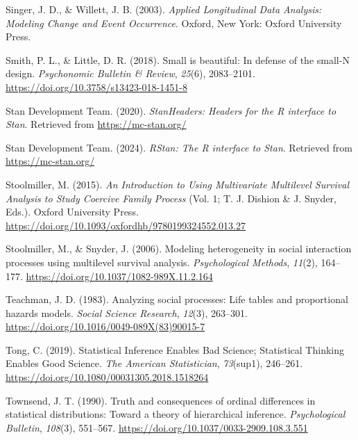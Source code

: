 \documentclass[
  man, donotrepeattitle,floatsintext]{apa6}
\newlength{\cslhangindent}
\newenvironment{CSLReferences}[2] %
 {\begin{list}{}{%
  \setlength{\itemindent}{0pt}
  \setlength{\leftmargin}{0pt}
  \setlength{\parsep}{0pt}
  \ifodd #1
   \setlength{\leftmargin}{\cslhangindent}
   \setlength{\itemindent}{-1\cslhangindent}
  \fi
  \setlength{\itemsep}{#2\baselineskip}}}
 {\end{list}}
\begin{document}
\begin{CSLReferences}{1}{0}
Singer, J. D., \& Willett, J. B. (2003). \emph{Applied {Longitudinal Data Analysis}: {Modeling Change} and {Event Occurrence}}. Oxford, New York: Oxford University Press.

Smith, P. L., \& Little, D. R. (2018). Small is beautiful: {In} defense of the small-{N} design. \emph{Psychonomic Bulletin \& Review}, \emph{25}(6), 2083--2101. \url{https://doi.org/10.3758/s13423-018-1451-8}

Stan Development Team. (2020). \emph{{StanHeaders}: Headers for the {R} interface to {Stan}}. Retrieved from \url{https://mc-stan.org/}

Stan Development Team. (2024). \emph{{RStan}: The {R} interface to {Stan}}. Retrieved from \url{https://mc-stan.org/}

Stoolmiller, M. (2015). \emph{An {Introduction} to {Using Multivariate Multilevel Survival Analysis} to {Study Coercive Family Process}} (Vol. 1; T. J. Dishion \& J. Snyder, Eds.). Oxford University Press. \url{https://doi.org/10.1093/oxfordhb/9780199324552.013.27}

Stoolmiller, M., \& Snyder, J. (2006). Modeling heterogeneity in social interaction processes using multilevel survival analysis. \emph{Psychological Methods}, \emph{11}(2), 164--177. \url{https://doi.org/10.1037/1082-989X.11.2.164}

Teachman, J. D. (1983). Analyzing social processes: {Life} tables and proportional hazards models. \emph{Social Science Research}, \emph{12}(3), 263--301. \url{https://doi.org/10.1016/0049-089X(83)90015-7}

Tong, C. (2019). Statistical {Inference Enables Bad Science}; {Statistical Thinking Enables Good Science}. \emph{The American Statistician}, \emph{73}(sup1), 246--261. \url{https://doi.org/10.1080/00031305.2018.1518264}

Townsend, J. T. (1990). Truth and consequences of ordinal differences in statistical distributions: {Toward} a theory of hierarchical inference. \emph{Psychological Bulletin}, \emph{108}(3), 551--567. \url{https://doi.org/10.1037/0033-2909.108.3.551}


\end{CSLReferences}
\end{document}
